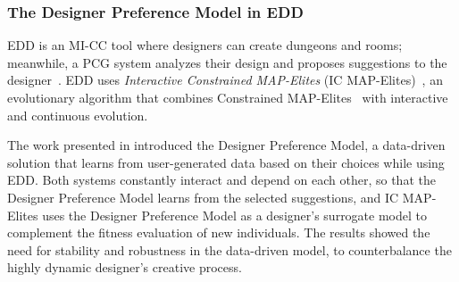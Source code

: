 




\subsubsection{The Designer Preference Model in EDD}

EDD is an MI-CC tool where designers can create dungeons and rooms; meanwhile, a PCG system analyzes their design and proposes suggestions to the designer~. EDD uses \emph{Interactive Constrained MAP-Elites} (IC MAP-Elites)~, an evolutionary algorithm that combines Constrained MAP-Elites~ with interactive and continuous evolution. 

The work presented in  introduced the Designer Preference Model, a data-driven solution that learns from user-generated data based on their choices while using EDD. Both systems constantly interact and depend on each other, so that the Designer Preference Model learns from the selected suggestions, and IC MAP-Elites uses the Designer Preference Model as a designer's surrogate model to complement the fitness evaluation of new individuals. The results showed the need for stability and robustness in the data-driven model, to counterbalance the highly dynamic designer's creative process.  

